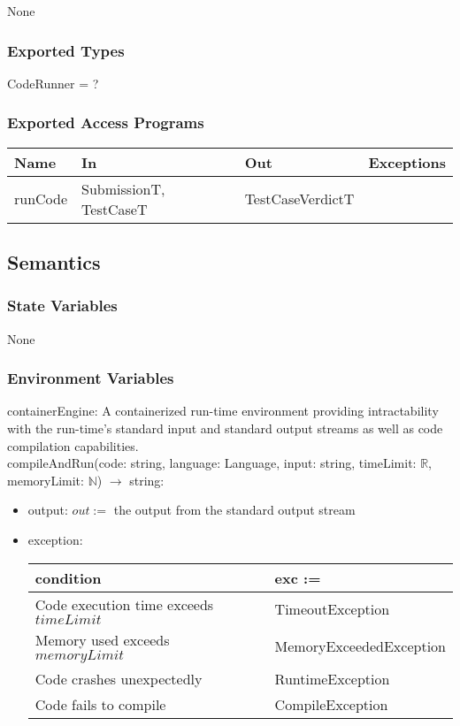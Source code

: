 \documentclass[12pt, titlepage]{article}
\begin{document}
None

\subsubsection{Exported Types}

CodeRunner = ?

\subsubsection{Exported Access Programs}

\begin{center}
\begin{tabular}{|p{2cm} | p{4cm} | p{4cm} | p{3cm} |}
\hline
\textbf{Name} & \textbf{In} & \textbf{Out} & \textbf{Exceptions} \\

\hline
runCode & SubmissionT, TestCaseT & TestCaseVerdictT & \\
\hline
\end{tabular}
\end{center}

\subsection{Semantics}

\subsubsection{State Variables}

None

\subsubsection{Environment Variables}

containerEngine: A containerized run-time environment providing intractability with the run-time's standard input and standard output streams as well as code compilation capabilities.\\
compileAndRun(code: string, language: Language, input: string, timeLimit: $\mathbb{R}$, memoryLimit: $\mathbb{N}$) $\rightarrow$ string:
\begin{itemize}
    \item output: $out := $ the output from the standard output stream
    \item exception: \begin{tabular}{p{5cm} p{4cm}}
    \hline
    \textbf{condition} & \textbf{exc :=} \\
    \hline
    Code execution time exceeds $timeLimit$ & TimeoutException \\
    Memory used exceeds $memoryLimit$ & MemoryExceededException \\
    Code crashes unexpectedly & RuntimeException \\
    Code fails to compile & CompileException \\
    \hline
    \end{tabular}
\end{itemize}
\end{document}
